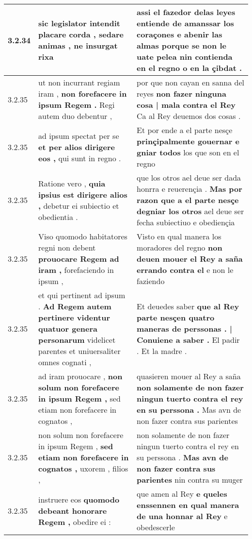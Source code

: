 \begin{tabular}{|p{1cm}|p{6.5cm}|p{6.5cm}|}
3.2.34 & sic legislator intendit placare corda , \textbf{ sedare animas , } ne insurgat rixa & assi el fazedor delas leyes entiende de amanssar los coraçones \textbf{ e abenir las almas } porque se non le uate pelea nin contienda en el regno o en la çibdat . \\\hline
3.2.35 & ut non incurrant regiam iram , \textbf{ non forefacere in ipsum Regem . } Regi autem duo debentur , & por que non cayan en sanna del reyes \textbf{ non fazer ninguna cosa | mala contra el Rey } Ca al Rey deuemos dos cosas . \\\hline
3.2.35 & ad ipsum spectat per se \textbf{ et per alios dirigere eos , } qui sunt in regno . & Et por ende a el parte nesçe \textbf{ prinçipalmente gouernar e gniar todos } los que son en el regno \\\hline
3.2.35 & Ratione vero , \textbf{ quia ipsius est dirigere alios , } debetur ei subiectio et obedientia . & que los otros ael deue ser dada honrra e reuerençia . \textbf{ Mas por razon que a el parte nesçe degniar los otros } ael deue ser fecha subiectiuo e obediençia \\\hline
3.2.35 & Viso quomodo habitatores regni non debent \textbf{ prouocare Regem ad iram , } forefaciendo in ipsum , & Visto en qual manera los moradores del regno \textbf{ non deuen mouer el Rey a saña errando contra el } e non le faziendo \\\hline
3.2.35 & et qui pertinent ad ipsum . \textbf{ Ad Regem autem pertinere videntur quatuor genera personarum } videlicet parentes et uniuersaliter omnes cognati , & Et deuedes saber \textbf{ que al Rey parte nesçen quatro maneras de perssonas . | Conuiene a saber . } El padir . Et la madre . \\\hline
3.2.35 & ad iram prouocare , \textbf{ non solum non forefacere in ipsum Regem , } sed etiam non forefacere in cognatos , & quasieren mouer al Rey a saña \textbf{ non solamente de non fazer ningun tuerto contra el rey en su perssona . } Mas avn de non fazer contra sus parientes \\\hline
3.2.35 & non solum non forefacere in ipsum Regem , \textbf{ sed etiam non forefacere in cognatos , } uxorem , filios , & non solamente de non fazer ningun tuerto contra el rey en su perssona . \textbf{ Mas avn de non fazer contra sus parientes } nin contra su muger \\\hline
3.2.35 & instruere eos \textbf{ quomodo debeant honorare Regem , } obedire ei : & que amen al Rey \textbf{ e queles enssennen en qual manera de una honnar al Rey } e obedescerle \\\hline

\end{tabular}
